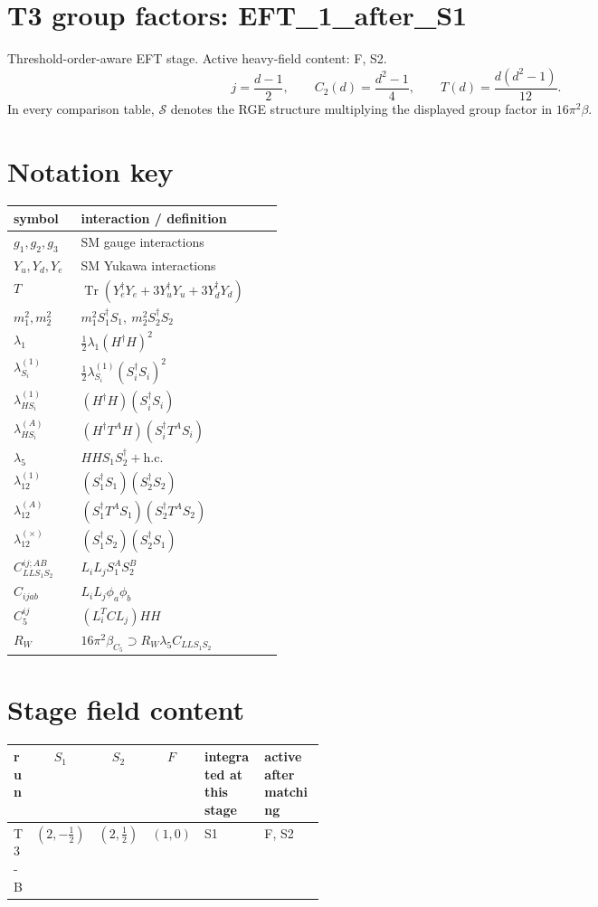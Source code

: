 \documentclass[9pt]{article}
\begin{document}
\section*{T3 group factors: EFT\_1\_after\_S1}
Threshold-order-aware EFT stage.  Active heavy-field content: F, S2.
\[j=\frac{d-1}{2},\qquad C_2(d)=\frac{d^2-1}{4},\qquad T(d)=\frac{d(d^2-1)}{12}.\]
In every comparison table, $\mathcal{S}$ denotes the RGE structure multiplying the displayed group factor in $16\pi^2\beta$.
\section*{Notation key}
\begin{longtable}{@{}p{0.23\linewidth}p{0.69\linewidth}@{}}
\toprule
symbol & interaction / definition \\
\midrule
$g_1,g_2,g_3$ & SM gauge interactions \\
$Y_u,Y_d,Y_e$ & SM Yukawa interactions \\
$T$ & $\operatorname{Tr}(Y_e^\dagger Y_e+3Y_u^\dagger Y_u+3Y_d^\dagger Y_d)$ \\
$m_1^2,m_2^2$ & $m_1^2S_1^\dagger S_1,\ m_2^2S_2^\dagger S_2$ \\
$\lambda_1$ & $\frac12\lambda_1(H^\dagger H)^2$ \\
$\lambda_{S_i}^{(1)}$ & $\frac12\lambda_{S_i}^{(1)}(S_i^\dagger S_i)^2$ \\
$\lambda_{HS_i}^{(1)}$ & $(H^\dagger H)(S_i^\dagger S_i)$ \\
$\lambda_{HS_i}^{(A)}$ & $(H^\dagger T^AH)(S_i^\dagger T^AS_i)$ \\
$\lambda_5$ & $HHS_1S_2^\dagger+\mathrm{h.c.}$ \\
$\lambda_{12}^{(1)}$ & $(S_1^\dagger S_1)(S_2^\dagger S_2)$ \\
$\lambda_{12}^{(A)}$ & $(S_1^\dagger T^AS_1)(S_2^\dagger T^AS_2)$ \\
$\lambda_{12}^{(\times)}$ & $(S_1^\dagger S_2)(S_2^\dagger S_1)$ \\
$C_{LLS_1S_2}^{ij;AB}$ & $L_iL_jS_1^AS_2^B$ \\
$C_{ijab}$ & $L_iL_j\phi_a\phi_b$ \\
$C_5^{ij}$ & $(L_i^TCL_j)HH$ \\
$R_W$ & $16\pi^2\beta_{C_5}\supset R_W\lambda_5C_{LLS_1S_2}$ \\
\bottomrule
\end{longtable}
\section*{Stage field content}
\begin{longtable}{@{}lccc p{0.20\linewidth}p{0.20\linewidth}@{}}
\toprule
run & $S_1$ & $S_2$ & $F$ & integrated at this stage & active after matching \\
\midrule
T3-B & $(2,- \frac{1}{2})$ & $(2,\frac{1}{2})$ & $(1,0)$ & S1 & F, S2 \\
\bottomrule
\end{longtable}
\end{document}
